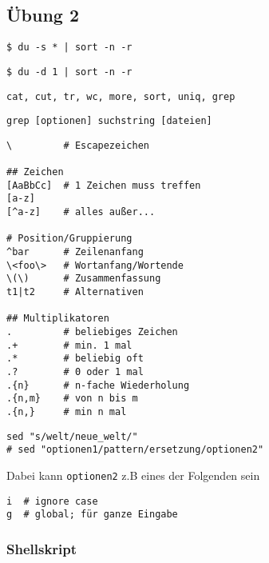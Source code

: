 	\subsection{Übung 2} %
	\label{sub:uebung_2}

		\begin{lstlisting}
$ du -s * | sort -n -r
		\end{lstlisting}

		\begin{lstlisting}
$ du -d 1 | sort -n -r
		\end{lstlisting}

		\lstShell[Filter]
		\begin{lstlisting}
cat, cut, tr, wc, more, sort, uniq, grep
		\end{lstlisting}

		\lstShell
		\begin{lstlisting}
grep [optionen] suchstring [dateien]
		\end{lstlisting}

		\begin{lstlisting}
\         # Escapezeichen

## Zeichen
[AaBbCc]  # 1 Zeichen muss treffen
[a-z]
[^a-z]    # alles außer...

# Position/Gruppierung
^bar      # Zeilenanfang
\<foo\>   # Wortanfang/Wortende
\(\)      # Zusammenfassung
t1|t2     # Alternativen

## Multiplikatoren
.         # beliebiges Zeichen
.+        # min. 1 mal
.*        # beliebig oft
.?        # 0 oder 1 mal
.{n}      # n-fache Wiederholung
.{n,m}    # von n bis m
.{n,}     # min n mal
		\end{lstlisting}

		\begin{lstlisting}
sed "s/welt/neue_welt/"
# sed "optionen1/pattern/ersetzung/optionen2"
		\end{lstlisting}
		Dabei kann \texttt{optionen2} z.B eines der Folgenden sein

		\lstShell
		\begin{lstlisting}
i  # ignore case
g  # global; für ganze Eingabe
		\end{lstlisting}

		\subsubsection{Shellskript} %
		\label{ssub:shellskript}

